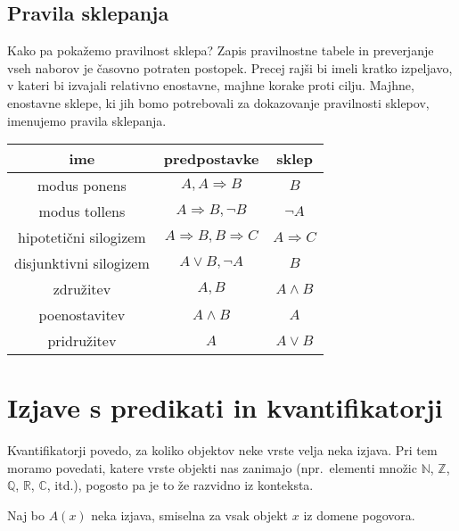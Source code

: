 \documentclass[11pt,paper=b5,footinclude,headinclude]{scrbook} %
\begin{document}
\subsection{Pravila sklepanja}
Kako pa pokažemo pravilnost sklepa? Zapis
pravilnostne tabele in preverjanje vseh naborov je časovno potraten postopek. Precej
rajši bi imeli kratko izpeljavo, v kateri bi izvajali relativno enostavne, majhne korake
proti cilju.
Majhne, enostavne sklepe, ki jih bomo potrebovali za dokazovanje pravilnosti sklepov,
imenujemo pravila sklepanja.

\begin{tabular}{|c|c|c|}
	\hline 
	ime & predpostavke & sklep\\
	\hline 
	\hline 
	modus ponens & $A,A\Rightarrow B$ & $B$\\
	\hline 
	modus tollens & $A\Rightarrow B,\neg B$ & $\neg A$\\
	\hline 
	hipoteti\v{c}ni silogizem & $A\Rightarrow B,B\Rightarrow C$ & $A\Rightarrow C$\\
	\hline 
	disjunktivni silogizem & $A\vee B,\neg A$ & $B$\\
	\hline 
	združitev  & $A,B$ & $A\wedge B$\\
	\hline 
	poenostavitev & $A\wedge B$ & $A$\\
	\hline 
	pridružitev & $A$ & $A\vee B$\\
	\hline 
\end{tabular}

{
\section{Izjave s predikati in kvantifikatorji}
}

Kvantifikatorji povedo, za koliko objektov neke vrste velja neka izjava.
Pri tem moramo povedati, katere vrste objekti nas zanimajo (npr.~elementi množic $\mathbb{N}$, $\mathbb{Z}$, $\mathbb{Q}$, $\mathbb{R}$, $\mathbb{C}$, itd.), pogosto pa je to že razvidno iz konteksta.

Naj bo $A(x)$ neka izjava, smiselna za vsak objekt $x$ iz domene pogovora.
\iftoggle{long}{
{\color{blue}Taki izjavi pravimo \emph{ predikat}.
Predikati oblike $A(x)$ so enomestni. Poznamo pa tudi dvo- in večmestne predikate, npr.~$A(x,y)$, $P(x_1,x_2,x_3)$ ipd.}
}
{Taki izjavi pravimo \emph{ predikat}. Predikati oblike $A(x)$ so enomestni. Poznamo pa tudi dvo- in večmestne predikate, npr.~$A(x,y)$, $P(x_1,x_2,x_3)$ ipd.}
\end{document}
